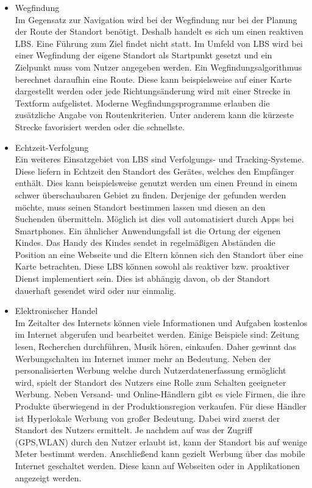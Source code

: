 \begin{itemize}
	\item Wegfindung\\
Im Gegensatz zur Navigation wird bei der Wegfindung nur bei der Planung der Route der Standort benötigt. Deshalb handelt es sich um einen reaktiven LBS. Eine Führung zum Ziel findet nicht statt. Im Umfeld von LBS wird bei einer Wegfindung der eigene Standort als Startpunkt gesetzt und ein Zielpunkt muss vom Nutzer angegeben werden. Ein Wegfindungsalgorithmus berechnet daraufhin eine Route. Diese kann beispielsweise auf einer Karte dargestellt werden oder jede Richtungsänderung wird mit einer Strecke in Textform aufgelistet. Moderne Wegfindungsprogramme erlauben die zusätzliche Angabe von Routenkriterien. Unter anderem kann die kürzeste Strecke favorisiert werden oder die schnellste.   
	\item Echtzeit-Verfolgung\\
Ein weiteres Einsatzgebiet von LBS sind Verfolgungs- und Tracking-Systeme. Diese liefern in Echtzeit den Standort des Gerätes, welches den Empfänger enthält. Dies kann beispielsweise genutzt werden um einen Freund in einem schwer überschaubaren Gebiet zu finden. Derjenige der gefunden werden möchte, muss seinen Standort bestimmen lassen und diesen an den Suchenden übermitteln. Möglich ist dies voll automatisiert durch Apps bei Smartphones. Ein ähnlicher Anwendungsfall ist die Ortung der eigenen Kindes. Das Handy des Kindes sendet in regelmäßigen Abständen die Position an eine Webseite und die Eltern können sich den Standort über eine Karte betrachten. Diese LBS können sowohl als reaktiver bzw. proaktiver Dienst implementiert sein. Dies ist abhängig davon, ob der Standort dauerhaft gesendet wird oder nur einmalig.\cite{FreundeFinden} \cite{KiFinden} 
	\item Elektronischer Handel\\
Im Zeitalter des Internets können viele Informationen und Aufgaben kostenlos im Internet abgerufen und bearbeitet werden. Einige Beispiele sind: Zeitung lesen, Recherchen durchführen, Musik hören, einkaufen. Daher gewinnt das Werbungschalten im Internet immer mehr an Bedeutung. Neben der personalisierten Werbung welche durch Nutzerdatenerfassung ermöglicht wird, spielt der Standort des Nutzers eine Rolle zum Schalten geeigneter Werbung. Neben Versand- und Online-Händlern gibt es viele Firmen, die ihre Produkte überwiegend in der Produktionsregion verkaufen. Für diese Händler ist Hyperlokale Werbung von großer Bedeutung. Dabei wird zuerst der Standort des Nutzers ermittelt. Je nachdem auf was der Zugriff (GPS,WLAN) durch den Nutzer erlaubt ist, kann der Standort bis auf wenige Meter bestimmt werden. Anschließend kann gezielt Werbung über das mobile Internet geschaltet werden. Diese kann auf Webseiten oder in Applikationen angezeigt werden. \cite{HyperWerbung} \cite{Adwords}

\end{itemize}
